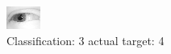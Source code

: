 \begin{figure}[h!]
\begin{center}
\includegraphics[width=0.60\columnwidth]{figures/ID2415_class_3_target_4.png}
\end{center}
\caption{ Classification: 3 actual target: 4}
\label{fig:ID2415_class_3_target_4}
\end{figure}
